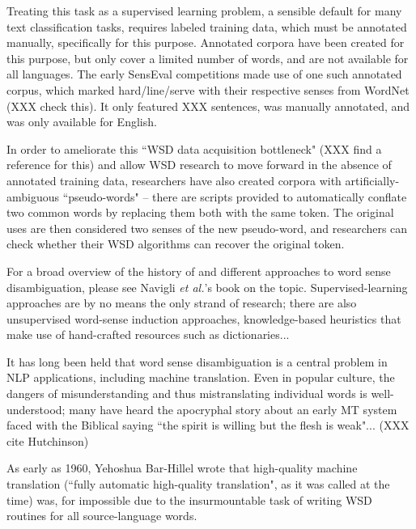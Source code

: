 

Treating this task as a supervised learning problem, a sensible default for
many text classification tasks, requires labeled training data, which must be
annotated manually, specifically for this purpose. Annotated corpora have been
created for this purpose, but only cover a limited number of words, and are not
available for all languages. The early SensEval competitions made use of one
such annotated corpus, which marked hard/line/serve with their respective
senses from WordNet (XXX check this). It only featured XXX sentences, was
manually annotated, and was only available for English.

In order to ameliorate this
``WSD data acquisition bottleneck" (XXX find a reference for this) and allow
WSD research to move forward in the absence of annotated training data,
researchers have also created corpora with artificially-ambiguous
``pseudo-words" -- there are scripts provided to automatically conflate two
common words by replacing them both with the same token. The original uses are
then considered two senses of the new pseudo-word, and researchers can check
whether their WSD algorithms can recover the original token.

For a broad overview of the history of and  different approaches to word sense
disambiguation, please see
Navigli \emph{et al.}'s book on the topic. \cite{agirre2006word}
Supervised-learning approaches are by no means the only strand of research;
there are also unsupervised word-sense induction approaches,
knowledge-based heuristics that make use of hand-crafted resources such as
dictionaries...

It has long been held that word sense disambiguation is a central problem in
NLP applications, including machine translation.
Even in popular culture, the dangers of misunderstanding and thus
mistranslating individual words is well-understood; many have heard the
apocryphal story about an early MT system faced with the Biblical saying ``the
spirit is willing but the flesh is weak"... (XXX cite Hutchinson)

As early as 1960, Yehoshua Bar-Hillel wrote that high-quality machine
translation (``fully automatic high-quality  translation", as it was  called at
the  time) was, for impossible due to the insurmountable task of writing WSD
routines for all source-language words. \cite{barhillel1960}

